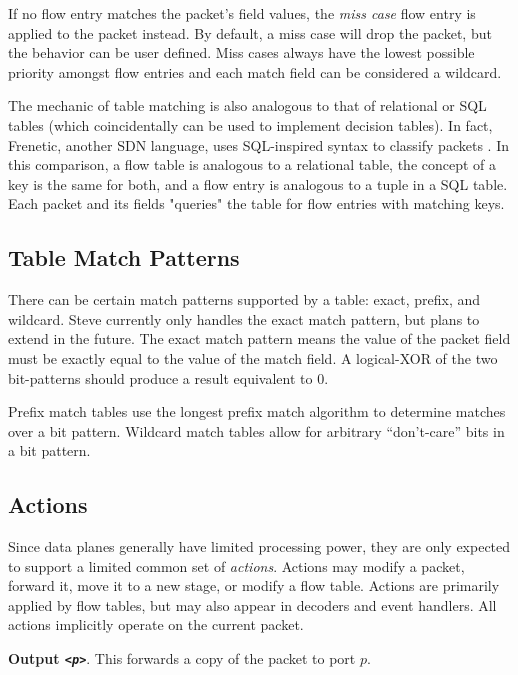 If no flow entry matches the packet's field values, the \emph{miss case} flow
entry is applied to the packet instead. By default, a miss case will drop the
packet, but the behavior can be user defined. Miss cases always have the lowest
possible priority amongst flow entries and each match field can be considered a
wildcard.

The mechanic of table matching is also analogous to that of relational or SQL
tables (which coincidentally can be used to implement decision tables). In fact,
Frenetic, another SDN language, uses SQL-inspired syntax to
classify packets \cite{foster2011frenetic, foster2013frenetic}. In this comparison, a flow table is analogous to a relational table, the concept of a
key is the same for both, and a flow entry is analogous to a tuple in a SQL
table. Each packet and its fields "queries" the table for flow entries with
matching keys.

\subsection{Table Match Patterns} \label{tut:match_patterns}

There can be certain match patterns supported by a table: exact, prefix, and wildcard. Steve currently only handles the exact match pattern, but plans to extend in the future. The exact match pattern means the value of the packet field must be exactly equal to the value of the match field. A logical-XOR of the two bit-patterns should produce a result equivalent to 0.

Prefix match tables use the longest prefix match algorithm to determine
matches over a bit pattern.
Wildcard match tables allow for arbitrary ``don't-care'' bits in a bit pattern.

\subsection{Actions} \label{action_desc}

Since data planes generally have limited processing power, they are only
expected to support a limited common set of \emph{actions}.
Actions may modify a packet, forward it, move it to a new stage, or modify a
flow table. 
Actions are primarily applied by flow tables, but may also appear in decoders
and event handlers. All actions implicitly operate on the current packet.


\textbf{Output \emph{\texttt{<p>}}}. This forwards a copy of the packet to port $p$.

